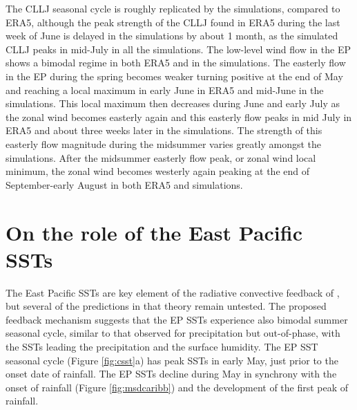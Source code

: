 The CLLJ seasonal cycle is roughly replicated by the simulations, compared to ERA5, although the peak strength of the CLLJ found in ERA5 during the last week of June is delayed in the simulations by about 1 month, as the simulated CLLJ peaks in mid-July in all the simulations.
The low-level wind flow in the EP shows a bimodal regime in both ERA5 and in the simulations. 
The easterly flow in the EP during the spring becomes weaker turning positive at the end of May and reaching a local maximum in early June in ERA5 and mid-June in the simulations. This local maximum then decreases during June and early July as the zonal wind becomes easterly again and this easterly flow peaks in mid July in ERA5 and about three weeks later in the simulations. The strength of this easterly flow magnitude during the midsummer varies greatly amongst the simulations. 
After the midsummer easterly flow peak, or zonal wind local minimum, the zonal wind becomes westerly again peaking at the end of September-early August in both ERA5 and simulations. 










\section{On the role of the East Pacific SSTs}

 



The East Pacific SSTs are key element of the radiative convective feedback of \cite{magana1999}, but several of the predictions in that theory remain untested.
The proposed feedback mechanism suggests that the EP SSTs experience also bimodal summer seasonal cycle, similar to that observed for precipitation but out-of-phase, with the SSTs leading the precipitation and the surface humidity.
The EP SST seasonal cycle (Figure \ref{fig:csst}a) has peak SSTs in early May, just prior to the onset date of rainfall. The EP SSTs decline during May in synchrony with the onset of rainfall (Figure \ref{fig:msdcaribb}) and the development of the first peak of rainfall. %



